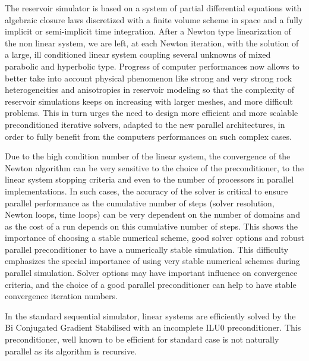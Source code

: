 \documentclass[twosided]{report}
\begin{document}
The reservoir simulator is based on a system of partial differential
equations with algebraic closure laws discretized with a finite volume
scheme in space and a fully implicit or semi-implicit time integration.
After a Newton type linearization of the non linear system, we are
left, at each Newton iteration, with the solution of a large, ill
conditioned linear system coupling several unknowns of mixed parabolic
and hyperbolic type. Progress of computer performances now allows to
better take into account physical phenomenon like strong and very
strong rock heterogeneities and anisotropies in reservoir modeling so
that the complexity of reservoir simulations keeps on increasing with
larger meshes, and more difficult problems. This in turn urges the need
to design more efficient and more scalable preconditioned iterative
solvers, adapted to the new parallel architectures, in order to fully
benefit from the computers performances on such complex cases.

Due to the high condition number of the linear system, the convergence
of the Newton algorithm can be very sensitive to the choice of the
preconditioner, to the linear system stopping criteria and even to the
number of processors in parallel implementations. In such cases, the
accuracy of the solver is critical to ensure parallel performance as
the cumulative number of steps (solver resolution, Newton loops, time
loops) can be very dependent on the number of domains and as the cost
of a run depends on this cumulative number of steps. This shows the
importance of choosing a stable numerical scheme, good solver options
and robust parallel preconditioner to have a numerically stable
simulation. This difficulty emphasizes the special importance of using
very stable numerical schemes during parallel simulation. Solver
options may have important influence on convergence criteria, and the
choice of a good parallel preconditioner can help to have stable
convergence iteration numbers.

In the standard sequential simulator, linear systems are efficiently
solved by the Bi Conjugated Gradient Stabilised with an incomplete ILU0
preconditioner. This preconditioner, well known to be efficient for
standard case is not naturally parallel as its algorithm is recursive.
\end{document}
